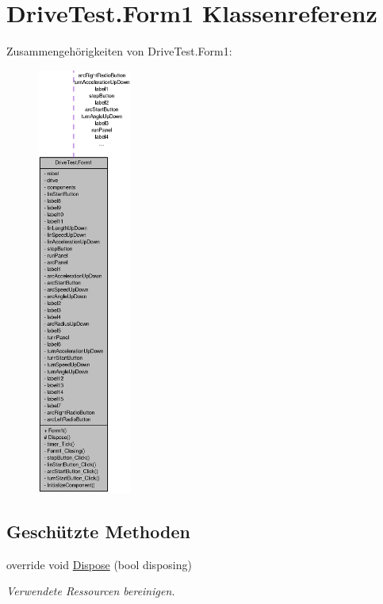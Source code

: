 \hypertarget{class_drive_test_1_1_form1}{
\section{DriveTest.Form1 Klassenreferenz}
\label{class_drive_test_1_1_form1}
}


Zusammengehörigkeiten von DriveTest.Form1:\nopagebreak
\begin{figure}[H]
\begin{center}
\leavevmode
\includegraphics[height=400pt]{class_drive_test_1_1_form1__coll__graph}
\end{center}
\end{figure}
\subsection*{Geschützte Methoden}
\begin{DoxyCompactItemize}
\item 
override void \hyperlink{class_drive_test_1_1_form1_a214a0a440a31be16cf29a0d717bfa824}{Dispose} (bool disposing)
\begin{DoxyCompactList}\small\item\em Verwendete Ressourcen bereinigen. \item\end{DoxyCompactList}\end{DoxyCompactItemize}


